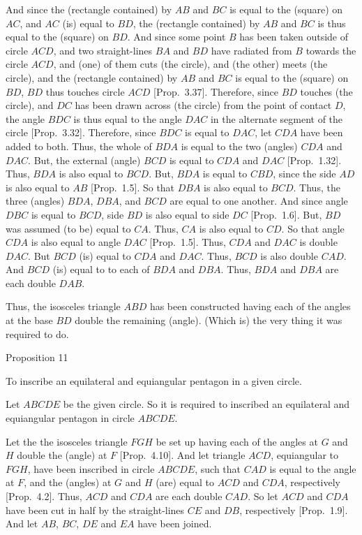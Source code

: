 And since the (rectangle contained) by $AB$ and $BC$ is equal to the
(square) on $AC$, and $AC$ (is) equal to $BD$, the (rectangle contained) by
$AB$ and $BC$ is thus equal to the (square) on $BD$. And since some point
$B$ has been taken outside of circle $ACD$, and two straight-lines $BA$ and
$BD$ have radiated from $B$ towards the circle $ACD$, and (one) of them
cuts (the circle), and (the other) meets (the circle), and the (rectangle contained)
by $AB$ and $BC$ is equal to the (square) on  $BD$,   $BD$ thus touches
circle $ACD$ [Prop.~3.37]. Therefore, since $BD$ touches (the circle),
and $DC$ has been drawn across (the circle) from the point of contact $D$,
the angle $BDC$ is thus equal to the angle $DAC$ in the alternate segment
of the circle [Prop.~3.32]. Therefore, since $BDC$ is equal to
$DAC$, let $CDA$ have been added to both. Thus, the whole of $BDA$ is equal
to the two (angles) $CDA$ and $DAC$. But, the
external (angle)  $BCD$  is equal to $CDA$ and $DAC$  [Prop.~1.32]. Thus, $BDA$ is also equal to
$BCD$. But, $BDA$ is equal to $CBD$, since the side $AD$ is also equal to
$AB$ [Prop.~1.5]. So that $DBA$ is also equal to $BCD$. Thus, the three
(angles) $BDA$, $DBA$, and $BCD$ are equal to one another. And since angle
$DBC$ is equal to $BCD$, side $BD$ is also equal to side $DC$ [Prop.~1.6].
But, $BD$ was assumed (to be) equal to $CA$. Thus, $CA$ is also equal to $CD$.
So that angle $CDA$ is also equal to angle $DAC$ [Prop.~1.5]. 
Thus, $CDA$ and $DAC$ is double $DAC$. But $BCD$ (is) equal to $CDA$ and
$DAC$. Thus, $BCD$ is also double $CAD$. And $BCD$ (is) equal to to each of
$BDA$ and $DBA$. Thus, $BDA$ and $DBA$ are each double $DAB$.

Thus, the isosceles triangle $ABD$ has been constructed having each of the
angles at the base $BD$ double the remaining (angle). (Which is) the
very thing it was required to do.


\begin{center}
{\large Proposition 11}
\end{center}

To inscribe an equilateral and equiangular pentagon in a given circle.

\epsfysize=1.8in
\centerline{}

Let $ABCDE$ be the given circle. So it is required to inscribed an equilateral
and equiangular pentagon in circle $ABCDE$.

Let the the isosceles triangle $FGH$ be set up having each of the angles
at $G$ and $H$ double the (angle) at $F$ [Prop.~4.10]. And let triangle $ACD$, equiangular
to $FGH$, have been inscribed in circle $ABCDE$, such that $CAD$ is equal 
to the angle at $F$, and  the (angles) at $G$ and $H$ (are) equal to $ACD$ and $CDA$, respectively [Prop.~4.2]. Thus,
$ACD$ and $CDA$ are each double $CAD$. So let $ACD$ and $CDA$ have 
been cut in half by the straight-lines $CE$ and $DB$, respectively
[Prop.~1.9]. And let $AB$, $BC$, $DE$ and
$EA$ have been joined.

